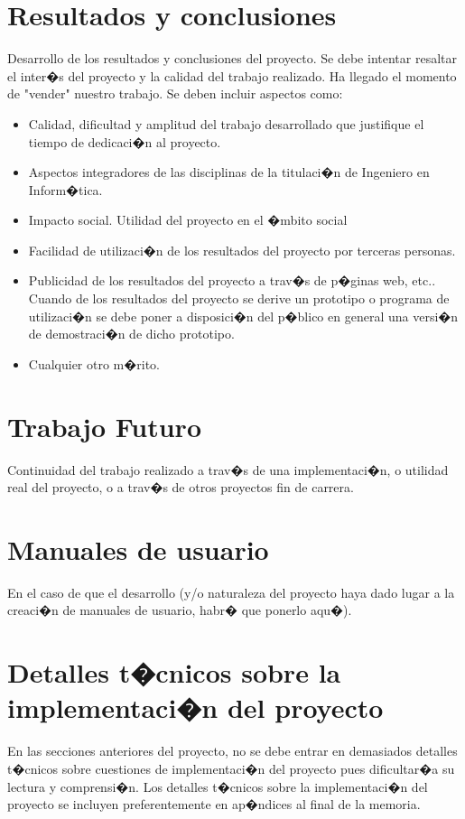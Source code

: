 \documentclass[12pt,letter,spanish]{book}
\begin{document}
\chapter{Resultados y conclusiones}
  Desarrollo de los resultados y conclusiones del proyecto. Se debe intentar resaltar el inter�s del proyecto
  y la calidad del trabajo realizado. Ha llegado el momento de "vender" nuestro trabajo. Se deben incluir aspectos como:

\begin{itemize}
\item Calidad, dificultad y amplitud del trabajo desarrollado que justifique el tiempo de dedicaci�n al proyecto.
\item Aspectos integradores de las disciplinas de la titulaci�n de Ingeniero en Inform�tica.
\item Impacto social. Utilidad del proyecto en el �mbito social
\item Facilidad de utilizaci�n de los resultados del proyecto por terceras personas.
\item Publicidad de los resultados del proyecto a trav�s de p�ginas web, etc.. Cuando de los resultados del proyecto
      se derive un prototipo o programa de utilizaci�n se debe poner a disposici�n del p�blico en general una versi�n
      de demostraci�n de dicho prototipo.
\item Cualquier otro m�rito.
\end{itemize}

\chapter{Trabajo Futuro}
    Continuidad del trabajo realizado a trav�s de una implementaci�n, o utilidad real del proyecto,
      o a trav�s de otros proyectos fin de carrera.


\appendix

\chapter{Manuales de usuario}

    En el caso de que el desarrollo (y/o naturaleza del proyecto haya dado lugar a la creaci�n de manuales
      de usuario, habr� que ponerlo aqu�).

\chapter[Detalles Implementaci�n]{Detalles t�cnicos sobre la implementaci�n del proyecto}
    En las secciones anteriores del proyecto, no se debe entrar en demasiados detalles t�cnicos sobre
      cuestiones de implementaci�n del proyecto pues dificultar�a su lectura y comprensi�n. Los detalles t�cnicos
      sobre la implementaci�n del proyecto se incluyen preferentemente en ap�ndices al final de la memoria.
\end{document}
